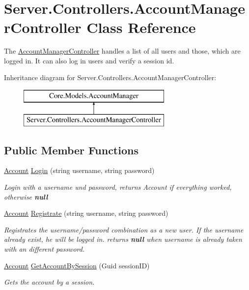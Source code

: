 \hypertarget{classServer_1_1Controllers_1_1AccountManagerController}{\section{Server.\-Controllers.\-Account\-Manager\-Controller Class Reference}
\label{classServer_1_1Controllers_1_1AccountManagerController}
}


The \hyperlink{classServer_1_1Controllers_1_1AccountManagerController}{Account\-Manager\-Controller} handles a list of all users and those, which are logged in. It can also log in users and verify a session id.  


Inheritance diagram for Server.\-Controllers.\-Account\-Manager\-Controller\-:\begin{figure}[H]
\begin{center}
\leavevmode
\includegraphics[height=2.000000cm]{classServer_1_1Controllers_1_1AccountManagerController}
\end{center}
\end{figure}
\subsection*{Public Member Functions}
\begin{DoxyCompactItemize}
\item 
\hyperlink{classCore_1_1Models_1_1Account}{Account} \hyperlink{classServer_1_1Controllers_1_1AccountManagerController_ae290a06ee465aca4b38a7cd61c304a26}{Login} (string username, string password)
\begin{DoxyCompactList}\small\item\em Login with a username und password, returns Account if everything worked, otherwise {\bfseries null} \end{DoxyCompactList}\item 
\hyperlink{classCore_1_1Models_1_1Account}{Account} \hyperlink{classServer_1_1Controllers_1_1AccountManagerController_aa78f40e7fdfcc38730c4fe118b52b5eb}{Registrate} (string username, string password)
\begin{DoxyCompactList}\small\item\em Registrates the username/password combination as a new user. If the username already exist, he will be logged in. returns {\bfseries null} when username is already taken with an different password. \end{DoxyCompactList}\item 
\hyperlink{classCore_1_1Models_1_1Account}{Account} \hyperlink{classServer_1_1Controllers_1_1AccountManagerController_afd9fd2cdd749a94178834540c91ceef4}{Get\-Account\-By\-Session} (Guid session\-I\-D)
\begin{DoxyCompactList}\small\item\em Gets the account by a session. \end{DoxyCompactList}\end{DoxyCompactItemize}
